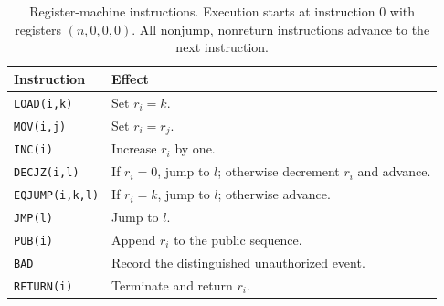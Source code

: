 \begin{table}[ht]
\centering\small
\caption{Register-machine instructions. Execution starts at instruction $0$ with registers $(n,0,0,0)$. All nonjump, nonreturn instructions advance to the next instruction.}
\label{tab:vm}
\begin{tabularx}{\textwidth}{lY}
\toprule
Instruction & Effect\\
\midrule
\texttt{LOAD(i,k)} & Set $r_i=k$.\\
\texttt{MOV(i,j)} & Set $r_i=r_j$.\\
\texttt{INC(i)} & Increase $r_i$ by one.\\
\texttt{DECJZ(i,l)} & If $r_i=0$, jump to $l$; otherwise decrement $r_i$ and advance.\\
\texttt{EQJUMP(i,k,l)} & If $r_i=k$, jump to $l$; otherwise advance.\\
\texttt{JMP(l)} & Jump to $l$.\\
\texttt{PUB(i)} & Append $r_i$ to the public sequence.\\
\texttt{BAD} & Record the distinguished unauthorized event.\\
\texttt{RETURN(i)} & Terminate and return $r_i$.\\
\bottomrule
\end{tabularx}
\end{table}
